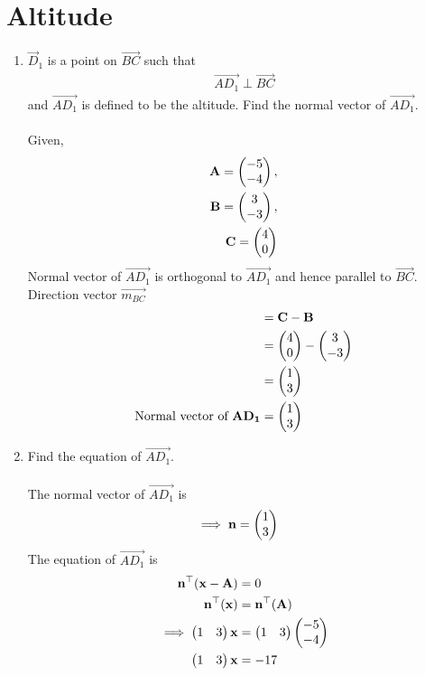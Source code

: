 \documentclass[10pt]{book}
\begin{document}
\section{Altitude}
\begin{enumerate}[label=\thesection.\arabic*.,ref=\thesection.\theenumi]

\item $\vec{D}_1$ is a point on $\vec{BC}$ such that
		\begin{align}
			\vec{AD_1} \perp \vec{BC}
		\end{align}
		and $\vec{AD_1}$ is defined to be the altitude. 
		Find the normal vector of $\vec{AD_1}$.\\
\solution\\
Given,
\begin{align}
\mathbf{A} = \begin{pmatrix}-5 \\ -4\end{pmatrix},\\
\mathbf{B} = \begin{pmatrix}3 \\ -3\end{pmatrix},\\
\mathbf{C} = \begin{pmatrix}4  \\ 0\end{pmatrix}
\end{align}
Normal vector of $\vec{AD_1}$ is orthogonal to $\vec{AD_1}$ and hence parallel to $\vec{BC}$. Direction vector $\vec{m_{BC}}$\\
\begin{align}
	&= \mathbf{C} - \mathbf{B}\\
        &= \begin{pmatrix}4 \\ 0\end{pmatrix} - \begin{pmatrix}3 \\ -3\end{pmatrix}\\
        &= \begin{pmatrix}1 \\ 3\end{pmatrix}\\
        \text{Normal vector of } \mathbf{AD_1} &= \begin{pmatrix} 1 \\ 3\end{pmatrix}
\end{align}

\item Find the equation of $\vec{AD_1}$. \\
\solution\\
The normal vector of $\vec{AD_1}$ is
\begin{align}
\implies \mathbf{n} &= \begin{pmatrix}1 \\ 3\end{pmatrix}
\end{align}
The equation of $\vec{AD_1}$ is
\begin{align}
 \mathbf{n}^{\top}(\mathbf{x-A}) &= 0 \\
 \mathbf{n}^{\top}(\mathbf{x}) &= \mathbf{n}^{\top}(\mathbf{A})\\
\implies \begin{pmatrix}1 & 3\end{pmatrix}\mathbf{x} &= \begin{pmatrix}1 & 3\end{pmatrix}\begin{pmatrix}-5 \\ -4\end{pmatrix}\\
\begin{pmatrix}1 & 3\end{pmatrix}\mathbf{x} &= -17
\end{align}


\end{enumerate}
\end{document}
